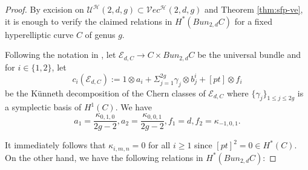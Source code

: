 \documentclass[11pt]{amsart}
\theoremstyle{definition}
\newcommand{\ri}{\rightarrow}
\newcommand{\h}{\mathcal{H}}
\newcommand{\U}{\mathscr{U}}
\newcommand{\ve}{\mathcal{V}ec}
\newcommand{\E}{\mathscr{E}}
\newcommand{\ka}{\kappa}
\begin{document}
\begin{proof}
	By excision on $\U^\h(2,d,g)\subset \ve^\h(2,d,g)$ and Theorem \ref{thm:sfp-ve}, it is enough to verify the claimed relations in 
	$H^*(Bun_{2,d}C)$ for a fixed hyperelliptic curve $C$ of genus $g$. 

Following the notation in \cite[Theorem 3.6.1]{shubham-r2-ss}, let $\E_{d,C}\ri C\times Bun_{2,d}C$ be the universal bundle and for $i\in\{1,2\}$, let
$$c_i(\E_{d,C}) := 1\otimes a_i+\Sigma_{j=1}^{2g}\gamma_j\otimes b_{j}^{i}+[pt]\otimes f_i$$
be the K\"unneth decomposition of the Chern classes of $\E_{d,C}$ where $\{\gamma_j\}_{1\leq j\leq 2g}$ is a symplectic basis of $H^1(C)$.
We have $$a_1 = \dfrac{\ka_{0,1,0}}{2g-2},a_2 = \dfrac{\ka_{0,0,1}}{2g-2}, f_1 = d, f_2 = \ka_{-1,0,1}.$$

It immediately follows that $\ka_{i,m,n} = 0$ for all $i\geq 1$ since $[pt]^2 = 0 \in H^*(C)$. 
On the other hand, we have the following relations in $H^*(Bun_{2,d}C)$:

\end{proof}
\end{document}
